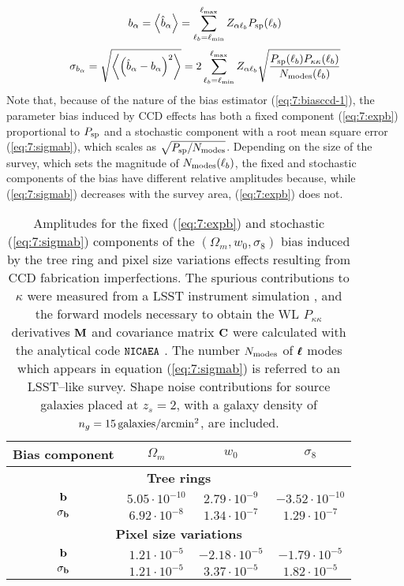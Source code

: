 \begin{equation}
\label{eq:7:expb}
b_\alpha = \left\langle\hat{b}_\alpha\right\rangle = \sum_{\ell_b=\ell_{\rm min}}^{\ell_{\rm max}} Z_{\alpha\ell_b}P_{\rm sp}(\ell_b)
\end{equation}
%
\begin{equation}
\label{eq:7:sigmab}
\sigma_{b_\alpha} = \sqrt{\left\langle\left(\hat{b}_\alpha-b_\alpha\right)^2\right\rangle} = 2\sum_{\ell_b=\ell_{\rm min}}^{\ell_{\rm max}} Z_{\alpha\ell_b}\sqrt{\frac{P_{\rm sp}(\ell_b)P_{\kappa\kappa}(\ell_b)}{N_{\rm modes}(\ell_b)}}
\end{equation}
%
Note that, because of the nature of the bias estimator (\ref{eq:7:biasccd-1}), the parameter bias induced by CCD effects has both a fixed component (\ref{eq:7:expb}) proportional to $P_{\rm sp}$ and a stochastic component with a root mean square error (\ref{eq:7:sigmab}), which scales as $\sqrt{P_{\rm sp}/N_{\rm modes}}$. Depending on the size of the survey, which sets the magnitude of $N_{\rm modes}(\ell_b)$, the fixed and stochastic components of the bias have different relative amplitudes because, while (\ref{eq:7:sigmab}) decreases with the survey area, (\ref{eq:7:expb}) does not.
%
\begin{table}
\begin{center}
\begin{tabular}{c|ccc}
\textbf{Bias component} & $\Omega_m$ & $w_0$ & $\sigma_8$ \\ \hline \hline
\multicolumn{4}{c}{\textbf{Tree rings}} \\ \hline
$\mathbf{b}$ & $5.05\cdot 10^{-10}$ & $2.79\cdot 10^{-9}$ & $-3.52\cdot 10^{-10}$ \\
$\sigma_{\mathbf{b}}$ & $6.92\cdot 10^{-8}$ & $1.34\cdot 10^{-7}$ & $1.29\cdot 10^{-7}$ \\ \hline

\multicolumn{4}{c}{\textbf{Pixel size variations}} \\ \hline
$\mathbf{b}$ & $1.21\cdot 10^{-5}$ & $-2.18\cdot 10^{-5}$ & $-1.79\cdot 10^{-5}$ \\
$\sigma_{\mathbf{b}}$ & $1.21\cdot 10^{-5}$ & $3.37\cdot 10^{-5}$ & $1.82\cdot 10^{-5}$ \\ \hline
\end{tabular}
\end{center}
\caption{Amplitudes for the fixed (\ref{eq:7:expb}) and stochastic (\ref{eq:7:sigmab}) components of the $(\Omega_m,w_0,\sigma_8)$ bias induced by the tree ring and pixel size variations effects resulting from CCD fabrication imperfections. The spurious contributions to $\kappa$ were measured from a LSST instrument simulation \citep{PetriCCD}, and the forward models necessary to obtain the WL $P_{\kappa\kappa}$ derivatives $\mathbf{M}$ and covariance matrix $\mathbf{C}$ were calculated with the analytical code $\texttt{NICAEA}$ \citep{Nicaea,Nicaea17}. The number $N_{\rm modes}$ of $\pmb{\ell}$ modes which appears in equation (\ref{eq:7:sigmab}) is referred to an LSST--like survey. Shape noise contributions for source galaxies placed at $z_s=2$, with a galaxy density of $n_g=15\,{\rm galaxies/arcmin^2}$, are included.}
\label{tab:7:ccdbias}
\end{table}
